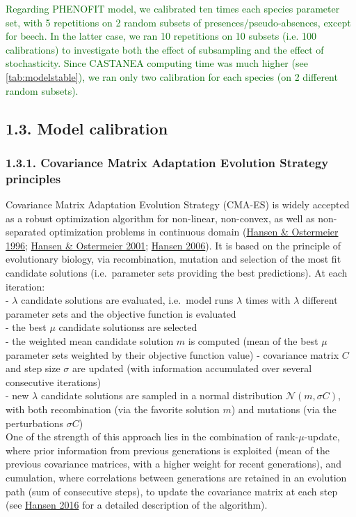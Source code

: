 \documentclass[11pt,]{article}
\begin{document}
\textcolor{darkgreen}{Regarding PHENOFIT model, we calibrated ten times each species parameter set, with 5 repetitions on 2 random subsets of presences/pseudo-absences, except for beech. In the latter case, we ran 10 repetitions on 10 subsets (i.e. 100 calibrations) to investigate both the effect of subsampling and the effect of stochasticity. Since CASTANEA computing time was much higher (see \autoref{tab:modelstable}), we ran only two calibration for each species (on  2 different random subsets).}

\hypertarget{model-calibration}{%
\subsection{1.3. Model calibration}\label{model-calibration}}

\hypertarget{covariance-matrix-adaptation-evolution-strategy-principles}{%
\subsubsection{1.3.1. Covariance Matrix Adaptation Evolution Strategy
principles}\label{covariance-matrix-adaptation-evolution-strategy-principles}}

Covariance Matrix Adaptation Evolution Strategy (CMA-ES) is widely
accepted as a robust optimization algorithm for non-linear, non-convex,
as well as non-separated optimization problems in continuous domain
(\protect\hyperlink{ref-Hansen1996}{Hansen \& Ostermeier 1996};
\protect\hyperlink{ref-Hansen2001}{Hansen \& Ostermeier 2001};
\protect\hyperlink{ref-Hansen2006}{Hansen 2006}). It is based on the
principle of evolutionary biology, via recombination, mutation and
selection of the most fit candidate solutions (i.e.~parameter sets
providing the best predictions). At each iteration:\\
- \(\lambda\) candidate solutions are evaluated, i.e.~model runs
\(\lambda\) times with \(\lambda\) different parameter sets and the
objective function is evaluated\\
- the best \(\mu\) candidate solutionss are selected\\
- the weighted mean candidate solution \(m\) is computed (mean of the
best \(\mu\) parameter sets weighted by their objective function value)
- covariance matrix \(C\) and step size \(\sigma\) are updated (with
information accumulated over several consecutive iterations)\\
- new \(\lambda\) candidate solutions are sampled in a normal
distribution \(\mathcal{N}(m, \sigma C)\), with both recombination (via
the favorite solution \(m\)) and mutations (via the perturbations
\(\sigma C\))\\
One of the strength of this approach lies in the combination of
rank-\(\mu\)-update, where prior information from previous generations
is exploited (mean of the previous covariance matrices, with a higher
weight for recent generations), and cumulation, where correlations
between generations are retained in an evolution path (sum of
consecutive steps), to update the covariance matrix at each step (see
\protect\hyperlink{ref-Hansen2016}{Hansen 2016} for a detailed
description of the algorithm).
\end{document}
